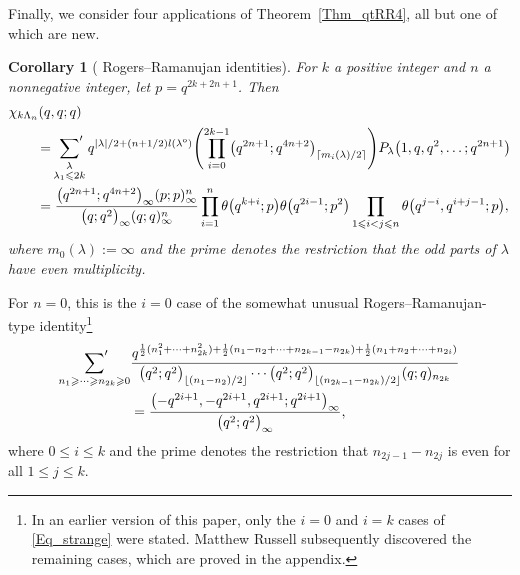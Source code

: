 \documentclass[pdftex]{sigma}
\numberwithin{equation}{section}
\newtheorem{Corollary}[Theorem]{Corollary}
\renewcommand{\leq}{\leqslant}
\renewcommand{\geq}{\geqslant}
\newcommand{\ceil}[1]{\lceil#1\rceil}
\newcommand{\floor}[1]{\lfloor#1\rfloor}
\newcommand{\abs}[1]{\vert#1\vert}
\newcommand{\la}{\lambda}
\newcommand{\La}{\Lambda}
\begin{document}
Finally, we consider four applications of Theorem~\ref{Thm_qtRR4},
all but one of which are new.

\begin{Corollary}[ Rogers--Ramanujan identities]
\label{Cor_15}
For $k$ a positive integer and $n$ a nonnegative integer,
let $p=q^{2k+2n+1}$.
Then
\begin{align}
&\chi_{k\La_n}(q,q;q) \notag \\
&\qquad{}=\sideset{}{'}\sum_{\substack{\la \\[1pt] \la_1\leq 2k}}
q^{\abs{\la}/2+(n+1/2)l(\la^{\textup{o}})}
\Biggl(\prod_{i=0}^{2k-1}\bigl(q^{2n+1};q^{4n+2}\bigr)_{\ceil{m_i(\la)/2}}\Biggr)
P_{\la}\bigl(1,q,q^2,\dots;q^{2n+1}\bigr) \notag \\
&\qquad{}=\frac{\bigl(q^{2n+1};q^{4n+2}\bigr)_{\infty}(p;p)_{\infty}^n}
{\bigl(q;q^2\bigr)_{\infty}(q;q)_{\infty}^n}
\prod_{i=1}^n \theta\bigl(q^{k+i};p\bigr)\theta\bigl(q^{2i-1};p^2\bigr)
\prod_{1\leq i<j\leq n}\theta\bigl(q^{j-i},q^{i+j-1};p\bigr),
\label{Eq_GOW7}
\end{align}
where $m_0(\la):=\infty$ and the prime denotes the restriction that
the odd parts of $\la$ have even multiplicity.
\end{Corollary}

For $n=0$, this is the $i=0$ case of the somewhat unusual
Rogers--Ramanujan-type identity\footnote{In an earlier version
of this paper, only the $i=0$ and $i=k$ cases of \eqref{Eq_strange}
were stated.
Matthew Russell subsequently discovered the remaining cases, which are proved
in the appendix.}
\begin{align}
\sideset{}{'}\sum_{n_1\geq\cdots\geq n_{2k}\geq 0} &
\frac{q^{\frac{1}{2}(n_1^2+\dots+n_{2k}^2)+
\frac{1}{2}(n_1-n_2+\dots+n_{2k-1}-n_{2k})+
\frac{1}{2}(n_1+n_2+\dots+n_{2i})}}
{\bigl(q^2;q^2\bigr)_{\floor{(n_1-n_2)/2}}\cdots
\bigl(q^2;q^2\bigr)_{\floor{(n_{2k-1}-n_{2k})/2}}
(q;q)_{n_{2k}}} \notag \\
&=\frac{\bigl(-q^{2i+1},-q^{2i+1},q^{2i+1};q^{2i+1}\bigr)_{\infty}}
{\bigl(q^2;q^2\bigr)_{\infty}},
\label{Eq_strange}
\end{align}
where $0\leq i\leq k$ and the prime denotes the restriction
that $n_{2j-1}-n_{2j}$ is even for all $1\leq j\leq k$.
\end{document}
